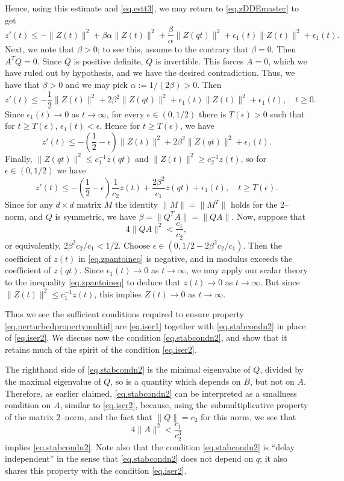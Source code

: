 \documentclass[a4paper,10pt,reqno]{amsart}
\numberwithin{equation}{section}
\theoremstyle{definition}
\theoremstyle{remark}
\DeclareMathOperator{\1}{\mathbbm 1}
\begin{document}
Hence, using this estimate and \eqref{eq.estt3}, we may return to \eqref{eq.zDDEmaster} to get  
\[
z'(t)\leq -\|Z(t)\|^2+\beta\alpha\|Z(t)\|^2+\frac{\beta}{\alpha}\|Z(qt)\|^2+\epsilon_1(t)\|Z(t)\|^2 + \epsilon_1(t).
\]
Next, we note that $\beta>0$; to see this, assume to the contrary that $\beta=0$. Then $A^TQ=0$. Since $Q$ is positive definite, $Q$ is invertible. This forces $A=0$, which we have ruled out by hypothesis, and we have the desired contradiction. Thus, we have that $\beta>0$ and we may    pick $\alpha:=1/(2\beta)>0$. Then 
\[
z'(t)\leq -\frac{1}{2}\|Z(t)\|^2
+2\beta^2\|Z(qt)\|^2+\epsilon_1(t)\|Z(t)\|^2 + \epsilon_1(t),\quad t\geq 0.
\]
Since $\epsilon_1(t)\to 0$ as $t\to\infty$, for every $\epsilon\in (0,1/2)$ there is $T(\epsilon)>0$ such that for $t\geq T(\epsilon)$, $\epsilon_1(t)<\epsilon$. Hence for $t\geq T(\epsilon)$, we have 
\[
z'(t)\leq -\left(\frac{1}{2}-\epsilon\right)\|Z(t)\|^2
+2\beta^2\|Z(qt)\|^2+ \epsilon_1(t).
\]
Finally, $\|Z(qt)\|^2\leq c_1^{-1}z(qt)$ and $\|Z(t)\|^2\geq c_2^{-1}z(t)$, so for $\epsilon\in (0,1/2)$ we have 
\begin{equation} \label{eq.zpantoineq}
z'(t)\leq -\left(\frac{1}{2}-\epsilon\right)\frac{1}{c_2}z(t)
+\frac{2\beta^2}{c_1}z(qt)+ \epsilon_1(t), \quad t\geq T(\epsilon).
\end{equation}
Since for any $d\times d$ matrix $M$ the identity $\|M\|=\|M^T\|$ holds for the 2--norm, and $Q$ is symmetric, we have $\beta=\|Q^TA\|=\|QA\|$. Now, suppose that 
\begin{equation} \label{eq.stabcondn2}
4\|QA\|^2< \frac{c_1}{c_2},
\end{equation}
or equivalently, $2\beta^2c_2/c_1<1/2$. Choose 
$\epsilon\in (0,1/2-2\beta^2 c_2/c_1)$. Then the coefficient of $z(t)$ in \eqref{eq.zpantoineq} is negative, and in modulus exceeds the coefficient of $z(qt)$. Since $\epsilon_1(t)\to 0$ as $t\to\infty$, we may apply our scalar theory to the inequality \eqref{eq.zpantoineq} to deduce that  $z(t)\to 0$ as $t\to\infty$. But since $\|Z(t)\|^2\leq c_1^{-1}z(t)$, this implies $Z(t)\to 0$ as $t\to\infty$. 

Thus we see the sufficient conditions required to ensure property \eqref{eq.perturbedpropertymultid} are \eqref{eq.iser1} together with \eqref{eq.stabcondn2} in place of \eqref{eq.iser2}. We discuss now the condition \eqref{eq.stabcondn2}, and show that it retains much of the spirit of the condition \eqref{eq.iser2}.

The righthand side of \eqref{eq.stabcondn2} is the minimal eigenvalue of $Q$, divided by the maximal eigenvalue of $Q$, so is a quantity which depends on $B$, but not on $A$. Therefore, as earlier claimed, \eqref{eq.stabcondn2} can be interpreted as a smallness condition on $A$, similar to \eqref{eq.iser2}, because, using the submultiplicative property of the matrix $2$--norm,
and the fact that  $\|Q\|=c_2$ for this norm,  we see that 
\[
4\|A\|^2< \frac{c_1}{c_2^3}
\]
implies \eqref{eq.stabcondn2}. Note also that the condition \eqref{eq.stabcondn2} is ``delay independent'' in the sense that \eqref{eq.stabcondn2} does not depend on $q$; it also shares this property with the condition \eqref{eq.iser2}. 
\end{document}

